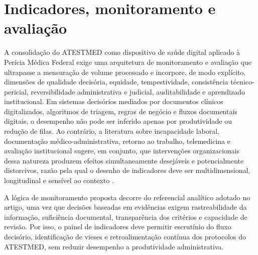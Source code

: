 \documentclass[12pt,a4paper]{article}
\begin{document}
\section{Indicadores, monitoramento e avaliação}
\label{sec:org3f2a6c0}
A consolidação do ATESTMED como dispositivo de saúde digital aplicado à Perícia Médica Federal exige uma arquitetura de monitoramento e avaliação que ultrapasse a mensuração de volume processado e incorpore, de modo explícito, dimensões de qualidade decisória, equidade, tempestividade, consistência técnico-pericial, reversibilidade administrativa e judicial, auditabilidade e aprendizado institucional. Em sistemas decisórios mediados por documentos clínicos digitalizados, algoritmos de triagem, regras de negócio e fluxos documentais digitais, o desempenho não pode ser inferido apenas por produtividade ou redução de filas. Ao contrário, a literatura sobre incapacidade laboral, documentação médico-administrativa, retorno ao trabalho, telemedicina e avaliação institucional sugere, em conjunto, que intervenções organizacionais dessa natureza produzem efeitos simultaneamente desejáveis e potencialmente distorcivos, razão pela qual o desenho de indicadores deve ser multidimensional, longitudinal e sensível ao contexto \parencite{soares20241031t0000000000asistematicadoatestmednaconcessa, ftouni2022challengesoftelemedicineduringthecovid19pandemica, gabbay2011niceguidanceonlongtermsicknessandincapacity, kelman2009performanceimprovementandperformancedysfunctionanemp}.

A lógica de monitoramento proposta decorre do referencial analítico adotado no artigo, uma vez que decisões baseadas em evidências exigem rastreabilidade da informação, suficiência documental, transparência dos critérios e capacidade de revisão. Por isso, o painel de indicadores deve permitir escrutínio do fluxo decisório, identificação de vieses e retroalimentação contínua dos protocolos do ATESTMED, sem reduzir desempenho a produtividade administrativa.
\end{document}
